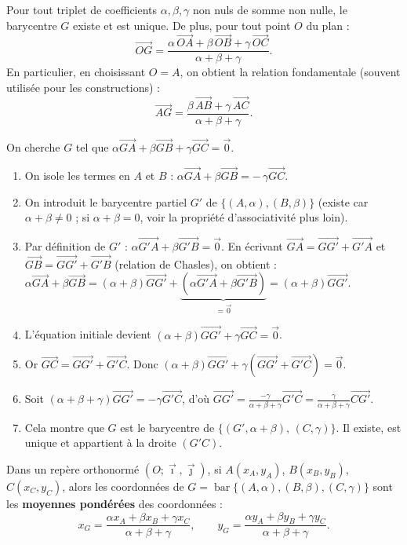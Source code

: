 \documentclass[11pt]{article}
\begin{document}
\begin{propriete}
Pour tout triplet de coefficients $\alpha,\beta,\gamma$ non nuls de somme non nulle, le barycentre $G$ existe et est unique. De plus, pour tout point $O$ du plan :
\[
\overrightarrow{OG} = \frac{\alpha\,\overrightarrow{OA} + \beta\,\overrightarrow{OB} + \gamma\,\overrightarrow{OC}}{\alpha+\beta+\gamma}.
\]
En particulier, en choisissant $O=A$, on obtient la relation fondamentale (souvent utilisée pour les constructions) :
\[
\overrightarrow{AG} = \frac{\beta\,\overrightarrow{AB} + \gamma\,\overrightarrow{AC}}{\alpha+\beta+\gamma}.
\]
\end{propriete}

\begin{experience}
On cherche $G$ tel que $\alpha\vec{GA}+\beta\vec{GB}+\gamma\vec{GC}=\vec{0}$.
\begin{enumerate}
\item On isole les termes en $A$ et $B$ : $\alpha\vec{GA}+\beta\vec{GB} = -\,\gamma\vec{GC}$.
\item On introduit le barycentre partiel $G'$ de $\{(A,\alpha),(B,\beta)\}$ (existe car $\alpha+\beta \neq 0$ ; si $\alpha+\beta=0$, voir la propriété d'associativité plus loin).
\item Par définition de $G'$ : $\alpha\vec{G'A}+\beta\vec{G'B}=\vec{0}$.
   En écrivant $\vec{GA} = \vec{GG'} + \vec{G'A}$ et $\vec{GB} = \vec{GG'} + \vec{G'B}$ (relation de Chasles), on obtient :
   $\alpha\vec{GA}+\beta\vec{GB} = (\alpha+\beta)\vec{GG'} + \underbrace{(\alpha\vec{G'A}+\beta\vec{G'B})}_{=\vec{0}} = (\alpha+\beta)\vec{GG'}$.
\item L'équation initiale devient $(\alpha+\beta)\vec{GG'} + \gamma\vec{GC} = \vec{0}$.
\item Or $\vec{GC} = \vec{GG'} + \vec{G'C}$. Donc $(\alpha+\beta)\vec{GG'} + \gamma(\vec{GG'}+\vec{G'C}) = \vec{0}$.
\item Soit $(\alpha+\beta+\gamma)\vec{GG'} = -\gamma\vec{G'C}$, d'où $\vec{GG'} = \frac{-\gamma}{\alpha+\beta+\gamma}\vec{G'C} = \frac{\gamma}{\alpha+\beta+\gamma}\vec{CG'}$.
\item Cela montre que $G$ est le barycentre de $\{(G',\alpha+\beta),\,(C,\gamma)\}$. Il existe, est unique et appartient à la droite $(G'C)$.
\end{enumerate}
\end{experience}

\begin{propriete}
Dans un repère orthonormé $(O;\vec{\imath},\vec{\jmath})$, si $A(x_A,y_A)$, $B(x_B,y_B)$, $C(x_C,y_C)$, alors les coordonnées de $G = \operatorname{bar}\{(A,\alpha),(B,\beta),(C,\gamma)\}$ sont les \textbf{moyennes pondérées} des coordonnées :
\[
x_G = \frac{\alpha x_A + \beta x_B + \gamma x_C}{\alpha+\beta+\gamma}, \qquad
y_G = \frac{\alpha y_A + \beta y_B + \gamma y_C}{\alpha+\beta+\gamma}.
\]
\end{propriete}
\end{document}
